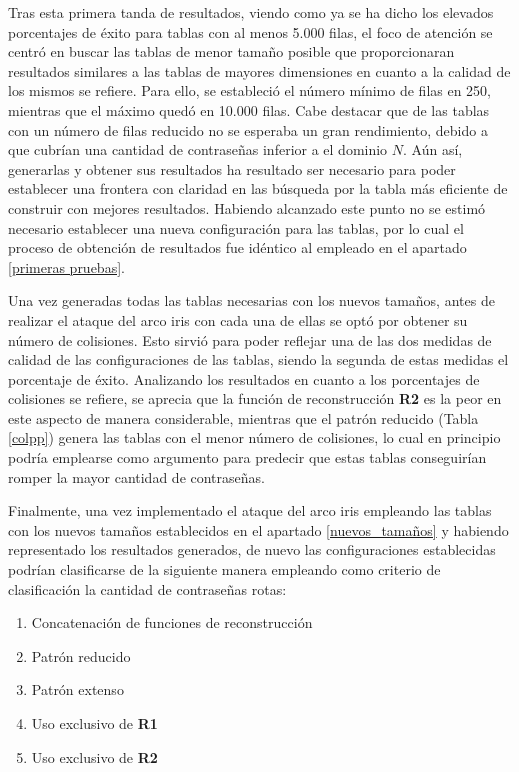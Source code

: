 \documentclass[12pt,spanish,listoffigures,listoftables]{tfgetsinf}
\begin{document}
Tras esta primera tanda de resultados, viendo como ya se ha dicho los elevados porcentajes de éxito para tablas con al menos 5.000 filas, el foco de atención se centró en buscar las tablas de menor tamaño posible que proporcionaran resultados similares a las tablas de mayores dimensiones en cuanto a la calidad de los mismos se refiere. Para ello, se estableció el número mínimo de filas en 250, mientras que el máximo quedó en 10.000 filas. Cabe destacar que de las tablas con un número de filas reducido no se esperaba un gran rendimiento, debido a que cubrían una cantidad de contraseñas inferior a el dominio $N$. Aún así, generarlas y obtener sus resultados ha resultado ser necesario para poder establecer una frontera con claridad en las búsqueda por la tabla más eficiente de construir con mejores resultados. Habiendo alcanzado este punto no se estimó necesario establecer una nueva configuración para las tablas, por lo cual el proceso de obtención de resultados fue idéntico al empleado en el apartado \ref{primeras pruebas}.

Una vez generadas todas las tablas necesarias con los nuevos tamaños, antes de realizar el ataque del arco iris con cada una de ellas se optó por obtener su número de colisiones. Esto sirvió para poder reflejar una de las dos medidas de calidad de las configuraciones de las tablas, siendo la segunda de estas medidas el porcentaje de éxito. Analizando los resultados en cuanto a los porcentajes de colisiones se refiere, se aprecia que la función de reconstrucción \textbf{R2} es la peor en este aspecto de manera considerable, mientras que el patrón reducido (Tabla \ref{colpp}) genera las tablas con el menor número de colisiones, lo cual en principio podría emplearse como argumento para predecir que estas tablas conseguirían romper la mayor cantidad de contraseñas.

Finalmente, una vez implementado el ataque del arco iris empleando las tablas con los nuevos tamaños establecidos en el apartado \ref{nuevos_tamaños} y habiendo representado los resultados generados, de nuevo las configuraciones establecidas podrían clasificarse de la siguiente manera empleando como criterio de clasificación la cantidad de contraseñas rotas:

\begin{enumerate}

    \item Concatenación de funciones de reconstrucción
    
    \item Patrón reducido
    
    \item Patrón extenso
    
    \item Uso exclusivo de \textbf{R1}
    
    \item Uso exclusivo de \textbf{R2}
    
\end{enumerate}
\end{document}
